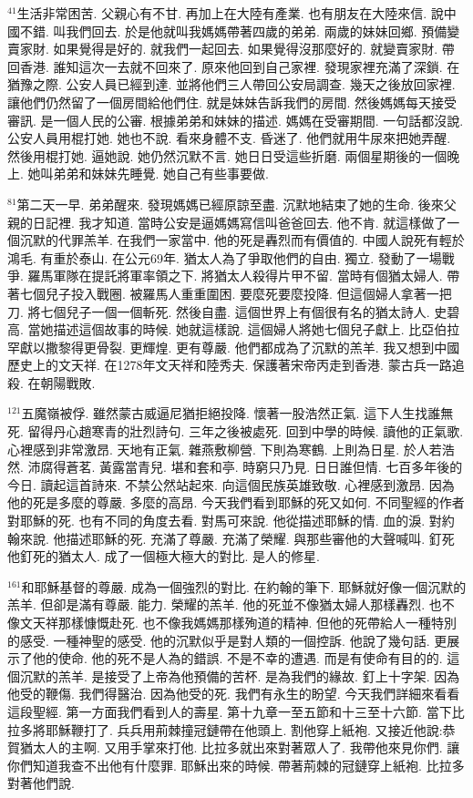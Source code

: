 \documentclass{book}
\begin{document}
$^{41}$生活非常困苦.
父親心有不甘.
再加上在大陸有產業.
也有朋友在大陸來信.
說中國不錯.
叫我們回去.
於是他就叫我媽媽帶著四歲的弟弟.
兩歲的妹妹回鄉.
預備變賣家財.
如果覺得是好的.
就我們一起回去.
如果覺得沒那麼好的.
就變賣家財.
帶回香港.
誰知這次一去就不回來了.
原來他回到自己家裡.
發現家裡充滿了深鎖.
在猶豫之際.
公安人員已經到達.
並將他們三人帶回公安局調查.
幾天之後放回家裡.
讓他們仍然留了一個房間給他們住.
就是妹妹告訴我們的房間.
然後媽媽每天接受審訊.
是一個人民的公審.
根據弟弟和妹妹的描述.
媽媽在受審期間.
一句話都沒說.
公安人員用棍打她.
她也不說.
看來身體不支.
昏迷了.
他們就用牛尿來把她弄醒.
然後用棍打她.
逼她說.
她仍然沉默不言.
她日日受這些折磨.
兩個星期後的一個晚上.
她叫弟弟和妹妹先睡覺.
她自己有些事要做.

$^{81}$第二天一早.
弟弟醒來.
發現媽媽已經原諒至盡.
沉默地結束了她的生命.
後來父親的日記裡.
我才知道.
當時公安是逼媽媽寫信叫爸爸回去.
他不肯.
就這樣做了一個沉默的代罪羔羊.
在我們一家當中.
他的死是轟烈而有價值的.
中國人說死有輕於鴻毛.
有重於泰山.
在公元69年.
猶太人為了爭取他們的自由.
獨立.
發動了一場戰爭.
羅馬軍隊在提託將軍率領之下.
將猶太人殺得片甲不留.
當時有個猶太婦人.
帶著七個兒子投入戰圈.
被羅馬人重重圍困.
要麼死要麼投降.
但這個婦人拿著一把刀.
將七個兒子一個一個斬死.
然後自盡.
這個世界上有個很有名的猶太詩人.
史碧高.
當她描述這個故事的時候.
她就這樣說.
這個婦人將她七個兒子獻上.
比亞伯拉罕獻以撒黎得更骨裂.
更輝煌.
更有尊嚴.
他們都成為了沉默的羔羊.
我又想到中國歷史上的文天祥.
在1278年文天祥和陸秀夫.
保護著宋帝丙走到香港.
蒙古兵一路追殺.
在朝陽戰敗.

$^{121}$五魔嶺被俘.
雖然蒙古威逼尼猶拒絕投降.
懷著一股浩然正氣.
這下人生找誰無死.
留得丹心趙寒青的壯烈詩句.
三年之後被處死.
回到中學的時候.
讀他的正氣歌.
心裡感到非常激昂.
天地有正氣.
雜燕敷柳營.
下則為寒鶴.
上則為日星.
於人若浩然.
沛腐得蒼茗.
黃露當青兒.
堪和套和亭.
時窮只乃見.
日日誰但情.
七百多年後的今日.
讀起這首詩來.
不禁公然站起來.
向這個民族英雄致敬.
心裡感到激昂.
因為他的死是多麼的尊嚴.
多麼的高昂.
今天我們看到耶穌的死又如何.
不同聖經的作者對耶穌的死.
也有不同的角度去看.
對馬可來說.
他從描述耶穌的情.
血的淚.
對約翰來說.
他描述耶穌的死.
充滿了尊嚴.
充滿了榮耀.
與那些審他的大聲喊叫.
釘死他釘死的猶太人.
成了一個極大極大的對比.
是人的修星.

$^{161}$和耶穌基督的尊嚴.
成為一個強烈的對比.
在約翰的筆下.
耶穌就好像一個沉默的羔羊.
但卻是滿有尊嚴.
能力.
榮耀的羔羊.
他的死並不像猶太婦人那樣轟烈.
也不像文天祥那樣慷慨赴死.
也不像我媽媽那樣殉道的精神.
但他的死帶給人一種特別的感受.
一種神聖的感受.
他的沉默似乎是對人類的一個控訴.
他說了幾句話.
更展示了他的使命.
他的死不是人為的錯誤.
不是不幸的遭遇.
而是有使命有目的的.
這個沉默的羔羊.
是接受了上帝為他預備的苦杯.
是為我們的緣故.
釘上十字架.
因為他受的鞭傷.
我們得醫治.
因為他受的死.
我們有永生的盼望.
今天我們詳細來看看這段聖經.
第一方面我們看到人的壽星.
第十九章一至五節和十三至十六節.
當下比拉多將耶穌鞭打了.
兵兵用荊棘撞冠鏈帶在他頭上.
割他穿上紙袍.
又接近他說:恭賀猶太人的主啊.
又用手掌來打他.
比拉多就出來對著眾人了.
我帶他來見你們.
讓你們知道我查不出他有什麼罪.
耶穌出來的時候.
帶著荊棘的冠鏈穿上紙袍.
比拉多對著他們說.
\end{document}
